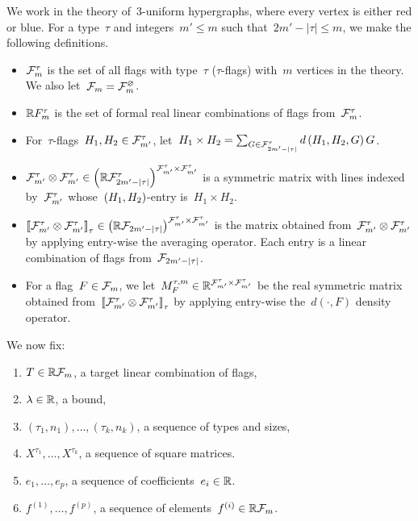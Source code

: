 \documentclass[11pt,a4paper,reqno]{amsart}
\begin{document}
We work in the theory of~$3$-uniform hypergraphs, where every vertex is either red or
blue. For a type~$\tau$ and integers~$m' \leq m$ such
that~$2m' - \left|\tau\right| \leq m$, we make the following definitions.
\begin{itemize}
\item ${\mathcal F}_m^\tau$ is the set of all flags with type~$\tau$ ($\tau$-flags) with~$m$ vertices in
  the theory. We also let~${\mathcal F}_m = {\mathcal F}_m^\varnothing$.
\item ${\mathbb R} F_m^\tau$ is the set of formal real linear combinations of flags
  from~${\mathcal F}_m^{\tau}$.
\item For~$\tau$-flags~$H_1, H_2 \in {\mathcal F}_{m'}^{\tau}$,
  let~$H_1 \times H_2 = \sum_{G \in {\mathcal F}_{2m' - \left| \tau \right|}^\tau} d\left(H_1, H_2, G\right) G$.
\item
  ${\mathcal F}_{m'}^{\tau} \otimes {\mathcal F}_{m'}^{\tau} \in \left({\mathbb R} {\mathcal F}_{2m' -
      \left|\tau\right|}^\tau\right)^{{\mathcal F}_{m'}^\tau \times {\mathcal F}_{m'}^\tau}$ is a symmetric matrix with lines
  indexed by~${\mathcal F}_{m'}^{\tau}$ whose~$\left(H_1, H_2\right)$-entry is~$H_1 \times H_2$.
\item
  $\left\llbracket {\mathcal F}_{m'}^{\tau} \otimes {\mathcal F}_{m'}^{\tau} \right\rrbracket_{\tau} \in \left({\mathbb R} {\mathcal F}_{2m' -
      \left|\tau\right|}\right)^{{\mathcal F}_{m'}^\tau \times {\mathcal F}_{m'}^\tau}$ is the matrix obtained
  from~${\mathcal F}_{m'}^{\tau} \otimes {\mathcal F}_{m'}^{\tau}$ by applying entry-wise the averaging
  operator. Each entry is a linear combination of flags
  from~${\mathcal F}_{2m' - \left|\tau\right|}$.
\item For a flag~$F \in {\mathcal F}_m$, we
  let~$M_F^{\tau, m} \in {\mathbb R}^{{\mathcal F}_{m'}^\tau \times {\mathcal F}_{m'}^\tau}$ be the real symmetric matrix
  obtained from~$\left\llbracket {\mathcal F}_{m'}^{\tau} \otimes {\mathcal F}_{m'}^{\tau} \right\rrbracket_{\tau}$ by applying
  entry-wise the~$d(\cdot, F)$ density operator.
\end{itemize}
We now fix:
\begin{enumerate}[label=(\textit{\roman*})]
\item\label{item:target} $T \in {\mathbb R}{\mathcal F}_m$, a target linear combination of flags,
\item\label{item:result} $\lambda \in {\mathbb R}$, a bound,
\item\label{item:types} $(\tau_1, n_1), \dots, (\tau_k, n_k)$, a sequence of types and sizes,
\item\label{item:matrices} $X^{\tau_1}, \dots, X^{\tau_k}$, a sequence of square matrices.
\item\label{item:e_vector} $e_1, \dots, e_p$, a sequence of coefficients~$e_i \in {\mathbb R}$.
\item\label{item:positives} $f^{(1)}, \dots, f^{(p)}$, a sequence of elements~$f^{(i)} \in {\mathbb R}{\mathcal F}_m$.
\end{enumerate}
\end{document}
